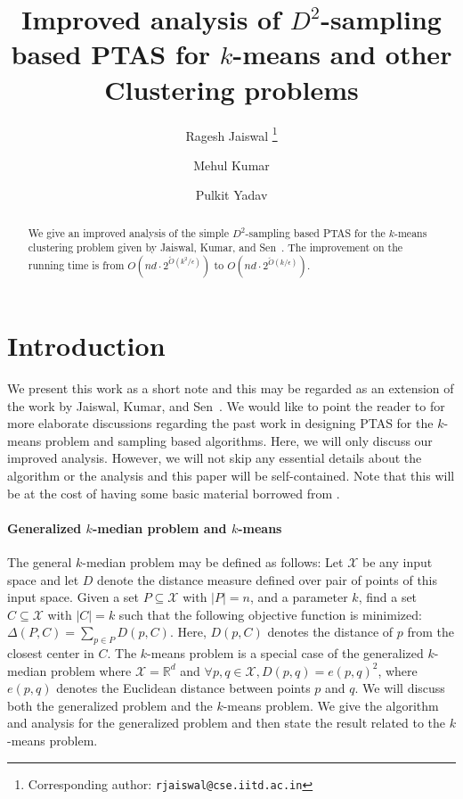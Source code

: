 \documentclass[11pt]{article}
\newcommand{\eps}{{\epsilon}}
\begin{document}
\title{Improved analysis of $D^2$-sampling based PTAS for $k$-means and other Clustering problems}

\author[1]{Ragesh Jaiswal \thanks{Corresponding author: \texttt{rjaiswal@cse.iitd.ac.in}}}
\author[1]{Mehul Kumar}
\author[1]{Pulkit Yadav}


\date{}

\maketitle

\begin{abstract}
We give an improved analysis of the simple $D^2$-sampling based PTAS for the $k$-means clustering problem given by Jaiswal, Kumar, and Sen~\cite{jks12}.
The improvement on the running time is from $O\left(nd \cdot 2^{\tilde{O}(k^2/\eps)}\right)$ to $O\left(nd \cdot 2^{\tilde{O}(k/\eps)}\right)$.
\end{abstract}


\section{Introduction}
We present this work as a short note and this may be regarded as an extension of the work by Jaiswal, Kumar, and Sen~\cite{jks12}.
We would like to point the reader to \cite{jks12} for more elaborate discussions regarding the past work in designing PTAS for the $k$-means problem and sampling based algorithms.
Here, we will only discuss our improved analysis.
However, we will not skip any essential details about the algorithm or the analysis and this paper will be self-contained.
Note that this will be at the cost of having some basic material borrowed from \cite{jks12}.


\paragraph{Generalized $k$-median problem and $k$-means} 
The general $k$-median problem may be defined as follows: 
Let $\mathcal{X}$ be any input space and let $D$ denote the distance measure defined over pair of points of this input space. 
Given a set $P \subseteq \mathcal{X}$ with $|P| = n$, and a parameter $k$, find a set $C \subseteq \mathcal{X}$ with $|C| = k$ such that the following objective function is minimized: $\Delta(P, C) = \sum_{p \in P} D(p, C)$.
Here, $D(p, C)$ denotes the distance of $p$ from the closest center in $C$.
The $k$-means problem is a special case of the generalized $k$-median problem where $\mathcal{X} = \mathbb{R}^d$ and $\forall p, q \in \mathcal{X}, D(p, q) = e(p, q)^2$, where $e(p, q)$ denotes the Euclidean distance between points $p$ and $q$.
We will discuss both the generalized problem and the $k$-means problem.
We give the algorithm and analysis for the generalized problem and then state the result related to the $k$-means problem.
\end{document}
